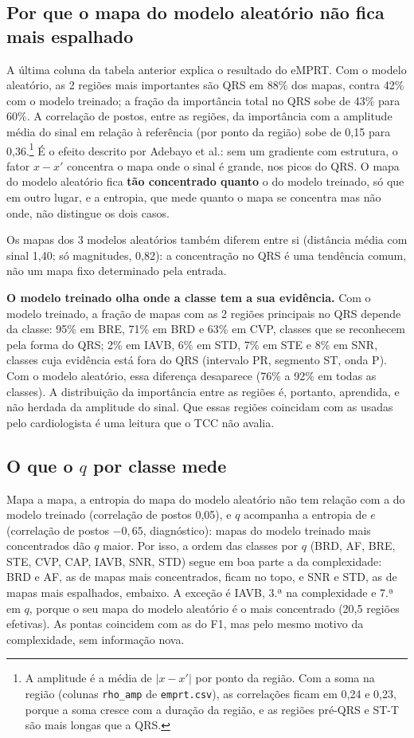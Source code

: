\documentclass[11pt,a4paper]{article}
\begin{document}
\subsection{Por que o mapa do modelo aleatório não fica mais espalhado}
A última coluna da tabela anterior explica o resultado do eMPRT. Com o modelo aleatório, as 2 regiões mais importantes são QRS em 88\% dos mapas, contra 42\% com o modelo treinado; a fração da importância total no QRS sobe de 43\% para 60\%. A correlação de postos, entre as regiões, da importância com a amplitude média do sinal em relação à referência (por ponto da região) sobe de 0,15 para 0,36.\footnote{A amplitude é a média de $|x - x'|$ por ponto da região. Com a soma na região (colunas \texttt{rho\_amp} de \texttt{emprt.csv}), as correlações ficam em 0,24 e 0,23, porque a soma cresce com a duração da região, e as regiões pré-QRS e ST-T são mais longas que a QRS.} É o efeito descrito por Adebayo et al.: sem um gradiente com estrutura, o fator $x - x'$ concentra o mapa onde o sinal é grande, nos picos do QRS. O mapa do modelo aleatório fica \textbf{tão concentrado quanto} o do modelo treinado, só que em outro lugar, e a entropia, que mede quanto o mapa se concentra mas não onde, não distingue os dois casos.

Os mapas dos 3 modelos aleatórios também diferem entre si (distância média com sinal 1,40; só magnitudes, 0,82): a concentração no QRS é uma tendência comum, não um mapa fixo determinado pela entrada.

\textbf{O modelo treinado olha onde a classe tem a sua evidência.} Com o modelo treinado, a fração de mapas com as 2 regiões principais no QRS depende da classe: 95\% em BRE, 71\% em BRD e 63\% em CVP, classes que se reconhecem pela forma do QRS; 2\% em IAVB, 6\% em STD, 7\% em STE e 8\% em SNR, classes cuja evidência está fora do QRS (intervalo PR, segmento ST, onda P). Com o modelo aleatório, essa diferença desaparece (76\% a 92\% em todas as classes). A distribuição da importância entre as regiões é, portanto, aprendida, e não herdada da amplitude do sinal. Que essas regiões coincidam com as usadas pelo cardiologista é uma leitura que o TCC não avalia.

\subsection{O que o $q$ por classe mede}
Mapa a mapa, a entropia do mapa do modelo aleatório não tem relação com a do modelo treinado (correlação de postos 0,05), e $q$ acompanha a entropia de $e$ (correlação de postos $-0{,}65$, diagnóstico): mapas do modelo treinado mais concentrados dão $q$ maior. Por isso, a ordem das classes por $q$ (BRD, AF, BRE, STE, CVP, CAP, IAVB, SNR, STD) segue em boa parte a da complexidade: BRD e AF, as de mapas mais concentrados, ficam no topo, e SNR e STD, as de mapas mais espalhados, embaixo. A exceção é IAVB, 3.ª na complexidade e 7.ª em $q$, porque o seu mapa do modelo aleatório é o mais concentrado (20,5 regiões efetivas). As pontas coincidem com as do F1, mas pelo mesmo motivo da complexidade, sem informação nova.
\end{document}
